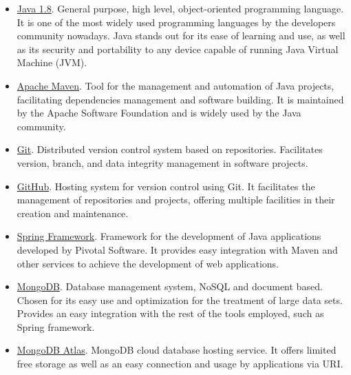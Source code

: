 \begin{itemize}

\item \href{https://www.java.com/}{Java 1.8}. General purpose, high level, object-oriented programming language. It is one of the most widely used programming languages by the developers community nowadays. Java stands out for its ease of learning and use, as well as its security and portability to any device capable of running Java Virtual Machine (JVM).\newline

\item \href{https://maven.apache.org/}{Apache Maven}. Tool for the management and automation of Java projects, facilitating dependencies management and software building. It is maintained by the Apache Software Foundation and is widely used by the Java community.\newline

\item \href{https://git-scm.com/}{Git}. Distributed version control system based on repositories. Facilitates version, branch, and data integrity management in software projects.\newline

\item \href{https://github.com/}{GitHub}. Hosting system for version control using Git. It facilitates the management of repositories and projects, offering multiple facilities in their creation and maintenance.\newline
	
\item \href{https://spring.io/}{Spring Framework}. Framework for the development of Java applications developed by Pivotal Software. It provides easy integration with Maven and other services to achieve the development of web applications.\newline

\item \href{https://www.mongodb.com/}{MongoDB}. Database management system, NoSQL and document based. Chosen for its easy use and optimization for the treatment of large data sets. Provides an easy integration with the rest of the tools employed, such as Spring framework.\newline
	
\item \href{https://www.mongodb.com/cloud/atlas/}{MongoDB Atlas}. MongoDB cloud database hosting service. It offers limited free storage as well as an easy connection and usage by applications via URI.\newline


\end{itemize}
